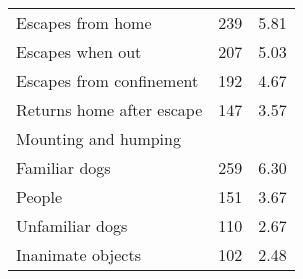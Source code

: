 \documentclass[varwidth=\maxdimen]{standalone}
\newcommand{\subrow}[1]{\hspace{1.25em}#1}
\begin{document}
\begin{tabular}[t]{lrr}
  \subrow{Escapes from home}                   &      239 &            5.81 \\
  \subrow{Escapes when out}                    &      207 &            5.03 \\
  \subrow{Escapes from confinement}            &      192 &            4.67 \\
  \subrow{Returns home after escape}           &      147 &            3.57 \\
Mounting and humping \\
  \subrow{Familiar dogs}                       &      259 &            6.30 \\
  \subrow{People}                              &      151 &            3.67 \\
  \subrow{Unfamiliar dogs}                     &      110 &            2.67 \\
  \subrow{Inanimate objects}                   &      102 &            2.48 \\
\bottomrule
\end{tabular}
\end{document}
